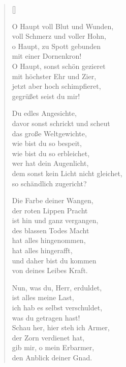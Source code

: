 \begin{multicols}{2}
\settowidth{\versewidth}{O Haupt voll Blut und Wunden,}
\begin{verse}[\versewidth]


 O Haupt voll Blut und Wunden,\\
voll Schmerz und voller Hohn,\\
o Haupt, zu Spott gebunden\\
mit einer Dornenkron!\\
O Haupt, sonst schön gezieret\\
mit höchster Ehr und Zier,\\
jetzt aber hoch schimpfieret,\\
gegrüßet seist du mir!

 Du edles Angesichte,\\
davor sonst schrickt und scheut\\
das große Weltgewichte,\\
wie bist du so bespeit,\\
wie bist du so erbleichet,\\
wer hat dein Augenlicht,\\
dem sonst kein Licht nicht gleichet,\\
so schändlich zugericht?

 Die Farbe deiner Wangen,\\
der roten Lippen Pracht\\
ist hin und ganz vergangen,\\
des blassen Todes Macht\\
hat alles hingenommen,\\
hat alles hingerafft,\\
und daher bist du kommen\\
von deines Leibes Kraft.

 Nun, was du, Herr, erduldet,\\
ist alles meine Last,\\
ich hab es selbst verschuldet,\\
was du getragen hast!\\
Schau her, hier steh ich Armer,\\
der Zorn verdienet hat,\\
gib mir, o mein Erbarmer,\\
den Anblick deiner Gnad.


\end{verse}
\end{multicols}
